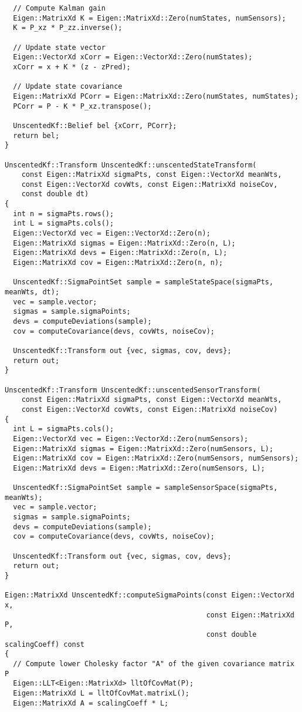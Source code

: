 \begin{verbatim}
  // Compute Kalman gain
  Eigen::MatrixXd K = Eigen::MatrixXd::Zero(numStates, numSensors);
  K = P_xz * P_zz.inverse();

  // Update state vector
  Eigen::VectorXd xCorr = Eigen::VectorXd::Zero(numStates);
  xCorr = x + K * (z - zPred);

  // Update state covariance
  Eigen::MatrixXd PCorr = Eigen::MatrixXd::Zero(numStates, numStates);
  PCorr = P - K * P_xz.transpose();

  UnscentedKf::Belief bel {xCorr, PCorr};
  return bel;
}

UnscentedKf::Transform UnscentedKf::unscentedStateTransform(
    const Eigen::MatrixXd sigmaPts, const Eigen::VectorXd meanWts,
    const Eigen::VectorXd covWts, const Eigen::MatrixXd noiseCov,
    const double dt)
{
  int n = sigmaPts.rows();
  int L = sigmaPts.cols();
  Eigen::VectorXd vec = Eigen::VectorXd::Zero(n);
  Eigen::MatrixXd sigmas = Eigen::MatrixXd::Zero(n, L);
  Eigen::MatrixXd devs = Eigen::MatrixXd::Zero(n, L);
  Eigen::MatrixXd cov = Eigen::MatrixXd::Zero(n, n);

  UnscentedKf::SigmaPointSet sample = sampleStateSpace(sigmaPts, meanWts, dt);
  vec = sample.vector;
  sigmas = sample.sigmaPoints;
  devs = computeDeviations(sample);
  cov = computeCovariance(devs, covWts, noiseCov);

  UnscentedKf::Transform out {vec, sigmas, cov, devs};
  return out;
}

UnscentedKf::Transform UnscentedKf::unscentedSensorTransform(
    const Eigen::MatrixXd sigmaPts, const Eigen::VectorXd meanWts,
    const Eigen::VectorXd covWts, const Eigen::MatrixXd noiseCov)
{
  int L = sigmaPts.cols();
  Eigen::VectorXd vec = Eigen::VectorXd::Zero(numSensors);
  Eigen::MatrixXd sigmas = Eigen::MatrixXd::Zero(numSensors, L);
  Eigen::MatrixXd cov = Eigen::MatrixXd::Zero(numSensors, numSensors);
  Eigen::MatrixXd devs = Eigen::MatrixXd::Zero(numSensors, L);

  UnscentedKf::SigmaPointSet sample = sampleSensorSpace(sigmaPts, meanWts);
  vec = sample.vector;
  sigmas = sample.sigmaPoints;
  devs = computeDeviations(sample);
  cov = computeCovariance(devs, covWts, noiseCov);

  UnscentedKf::Transform out {vec, sigmas, cov, devs};
  return out;
}

Eigen::MatrixXd UnscentedKf::computeSigmaPoints(const Eigen::VectorXd x,
                                                const Eigen::MatrixXd P,
                                                const double scalingCoeff) const
{
  // Compute lower Cholesky factor "A" of the given covariance matrix P
  Eigen::LLT<Eigen::MatrixXd> lltOfCovMat(P);
  Eigen::MatrixXd L = lltOfCovMat.matrixL();
  Eigen::MatrixXd A = scalingCoeff * L;


\end{verbatim}

